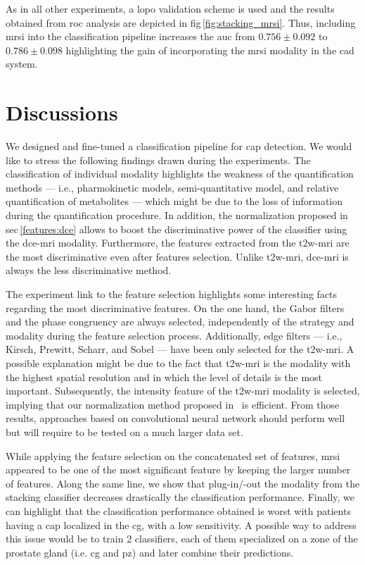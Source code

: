 \documentclass[final,3p,times,twocolumn]{elsarticle}
\begin{document}
As in all other experiments, a \ac{lopo} validation scheme is used and the
results obtained from \ac{roc} analysis are depicted in
\acs{fig}\,\ref{fig:stacking_mrsi}. Thus, including \ac{mrsi} into the
classification pipeline increases the \ac{auc} from $0.756 \pm 0.092$ to $0.786
\pm 0.098$ highlighting the gain of incorporating the \ac{mrsi} modality in the
\ac{cad} system.

\section{Discussions}\label{sec:conclusion}

We designed and fine-tuned a classification pipeline for \ac{cap} detection.
We would like to stress the following findings drawn during the
experiments. The classification of individual modality highlights the weakness
of the quantification methods --- i.e., pharmokinetic models, semi-quantitative
model, and relative quantification of metabolites --- which might be due to the
loss of information during the quantification procedure. In addition, the
normalization proposed in \acs{sec}\,\ref{features:dce} allows to boost the
discriminative power of the classifier using the \ac{dce}-\ac{mri}
modality. Furthermore, the features extracted from the \ac{t2w}-\ac{mri} are
the most discriminative even after features selection. Unlike
\ac{t2w}-\ac{mri}, \ac{dce}-\ac{mri} is always the less discriminative method.

The experiment link to the feature selection highlights some interesting facts
regarding the most discriminative features. On the one hand, the Gabor filters
and the phase congruency are always selected, independently of the strategy and
modality during the feature selection process. Additionally, edge filters ---
i.e., Kirsch, Prewitt, Scharr, and Sobel --- have been only selected for the
\ac{t2w}-\ac{mri}. A possible explanation might be due to the fact that
\ac{t2w}-\ac{mri} is the modality with the highest spatial resolution and in
which the level of details is the most important. Subsequently, the intensity
feature of the \ac{t2w}-\ac{mri} modality is selected, implying that our
normalization method proposed in~\cite{lemaitre2016normalization} is
efficient. From those results, approaches based on convolutional neural network
should perform well but will require to be tested on a much larger data set.

While applying the feature selection on the concatenated set of features,
\ac{mrsi} appeared to be one of the most significant feature by keeping the
larger number of features. Along the same line, we show that plug-in/-out the
modality from the stacking classifier decreases drastically the classification
performance. Finally, we can highlight that the classification performance
obtained is worst with patients having a \ac{cap} localized in the
\ac{cg}, with a low sensitivity. A possible way to address this issue would be
to train 2 classifiers, each of them specialized on a zone of the prostate
gland (i.e. \ac{cg} and \ac{pz}) and later combine their predictions.
\end{document}
